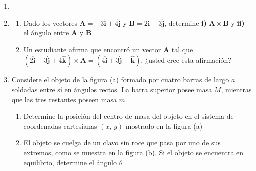 \documentclass[letterpaper,11pt]{article}
\begin{document}
\vspace{-1cm}
\begin{enumerate}\setlength{\itemsep}{0.4cm}

\item[]

\item
\begin{enumerate}
    \item Dado los vectores $\mathbf{A} = -3\mathbf{\hat{i}} + 4\mathbf{\hat{j}}$ y $\mathbf{B} = 2\mathbf{\hat{i}} + 3\mathbf{\hat{j}}$, determine \textbf{i)} $\mathbf{A}\times\mathbf{B}$ y \textbf{ii)} el ángulo entre $\mathbf{A}$ y $\mathbf{B}$
    
    \item Un estudiante afirma que encontró un vector $\mathbf{A}$ tal que $(2\mathbf{\hat{i}}-3\mathbf{\hat{j}}+4\mathbf{\hat{k}})\times\mathbf{A} = (4\mathbf{\hat{i}} + 3\mathbf{\hat{j}}-\mathbf{\hat{k}})$, ¿usted cree esta afirmación?
\end{enumerate}

\item Considere el objeto de la figura (a) formado por cuatro barras de largo $a$ soldadas entre sí en ángulos rectos. La barra superior posee masa $M$, mientras que las tres restantes poseen masa $m$.

\begin{enumerate}
    \item Determine la posición del centro de masa del objeto en el sistema de coordenadas cartesianas $(x, \, y)$ mostrado en la figura (a)
    
    \item El objeto se cuelga de un clavo sin roce que pasa por uno de sus extremos, como se muestra en la figura (b). Si el objeto se encuentra en equilibrio, determine el ángulo $\theta$
\end{enumerate}


\end{enumerate}
\end{document}
